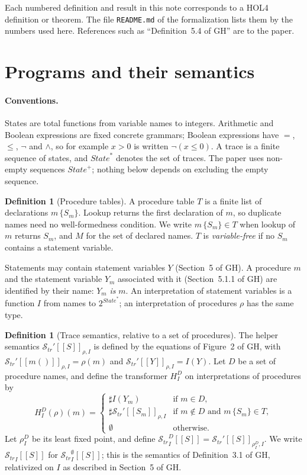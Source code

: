 \documentclass[11pt]{article}
\newcommand{\sem}[1]{[\![ #1 ]\!]}
\newcommand{\Str}{{\mathcal{S}_{\mathit{tr}}}}
\newcommand{\dup}{\sharp}
\newcommand{\State}{\mathit{State}}
\newcommand{\call}[1]{#1()}
\newcommand{\Tr}{\State^{*}}
\newcommand{\pow}[1]{2^{#1}}
\newcommand{\GH}[1]{#1 of GH}
\theoremstyle{plain}
\theoremstyle{definition}
\newtheorem{definition}[theorem]{Definition}
\theoremstyle{remark}
\begin{document}
Each numbered definition and result in this note corresponds to a HOL4
definition or theorem. The file \texttt{README.md} of the formalization
lists them by the numbers used here. References such as
``\GH{Definition~5.4}'' are to the paper.

\section{Programs and their semantics}\label{sec:prelim}

\paragraph{Conventions.} States are total functions from variable names to
integers. Arithmetic and Boolean expressions are fixed concrete grammars;
Boolean expressions have $=$, $\leq$, $\lnot$ and $\land$, so for example
$x > 0$ is written $\lnot(x \leq 0)$. A trace is a finite sequence of
states, and $\Tr$ denotes the set of traces. The paper uses non-empty
sequences $\State^{+}$; nothing below depends on excluding the empty
sequence.

\begin{definition}[Procedure tables]
  A procedure table $T$ is a finite list of declarations $m\,\{S_m\}$. Lookup
  returns the first declaration of $m$, so duplicate names need no
  well-formedness condition. We write $m\,\{S_m\} \in T$ when lookup of $m$
  returns $S_m$, and $M$ for the set of declared names. $T$ is
  \emph{variable-free} if no $S_m$ contains a statement variable.
\end{definition}

Statements may contain statement variables $Y$ (\GH{Section~5}). A procedure
$m$ and the statement variable $Y_m$ associated with it (\GH{Section~5.1.1})
are identified by their name: $Y_m$ \emph{is} $m$. An interpretation of
statement variables is a function $I$ from names to $\pow{\Tr}$; an
interpretation of procedures $\rho$ has the same type.

\begin{definition}[Trace semantics, relative to a set of procedures]
  \label{def:str}
  The helper semantics $\Str'\sem{S}_{\rho,I}$ is defined by the equations of
  \GH{Figure~2}, with $\Str'\sem{\call{m}}_{\rho,I} = \rho(m)$ and
  $\Str'\sem{Y}_{\rho,I} = I(Y)$. Let $D$ be a set of procedure names, and
  define the transformer $H^D_I$ on interpretations of procedures by
  \[
    H^D_I(\rho)(m) =
    \begin{cases}
      \dup I(Y_m) & \text{if } m \in D,\\
      \dup \Str'\sem{S_m}_{\rho,I} & \text{if } m \notin D \text{ and } m\,\{S_m\} \in T,\\
      \emptyset & \text{otherwise.}
    \end{cases}
  \]
  Let $\rho^D_I$ be its least fixed point, and define
  $\Str^D_I\sem{S} = \Str'\sem{S}_{\rho^D_I,I}$. We write
  $\Str_I\sem{S}$ for $\Str^{\emptyset}_I\sem{S}$; this is the semantics of
  \GH{Definition~3.1}, relativized on $I$ as described in \GH{Section~5}.
\end{definition}
\end{document}
